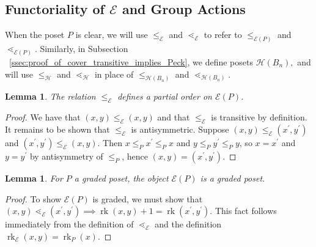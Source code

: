 \documentclass[10 pt]{amsart}
\theoremstyle{plain}
\newtheorem{lem}[thm]{Lemma}
\theoremstyle{definition}
\theoremstyle{remark}
\numberwithin{equation}{section}
\newcommand\ssec{\subsection}
\newcommand\rk{\operatorname{rk}}
\begin{document}
\ssec{Functoriality of $\mathcal E$ and Group Actions}

When the poset $P$ is clear, we will use $\leq_{\mathcal E}$ and $\lessdot_{\mathcal E}$ to refer to $\leq_{\mathcal E(P)}$ and $\lessdot_{\mathcal E(P)}$. Similarly, in Subsection ~\ref{ssec:proof_of_cover_transitive_implies_Peck}, we define posets $\mathcal H(B_n),$ and will use $\leq_{\mathcal H}$ and $\lessdot_{\mathcal H}$ in place of $\leq_{\mathcal H(B_n)}$ and $\lessdot_{\mathcal H(B_n)}$.

\begin{lem}\label{lem:f_partial_order}
The relation $\le_{\mathcal E}$ defines a partial order on $\mathcal E(P)$.
\end{lem}

\begin{proof}
We have that $(x, y)\le_{\mathcal E} (x, y)$ and that $\le_{\mathcal E}$ is transitive by definition.  It remains to be shown that $\le_{\mathcal E}$ is antisymmetric.  Suppose $(x, y)\le_{\mathcal E} (x^\prime, y^\prime)$ and $(x^\prime, y^\prime)\le_{\mathcal E} (x, y)$.  Then $x\le_P x^\prime \le_P x$ and $y\le_P y^\prime \le_P y$, so $x = x^\prime$ and $y=y^\prime$ by antisymmetry of $\le_P$, hence $(x, y) = (x^\prime, y^\prime)$.
\end{proof}

\begin{lem}\label{lem:FP_graded_poset}
For $P$ a graded poset, the object $\mathcal E(P)$ is a graded poset.
\end{lem}

\begin{proof}
To show $\mathcal E(P)$ is graded, we must show that $(x, y) \lessdot_{\mathcal E} (x^\prime, y^\prime) \implies \rk(x, y)+1 = \rk(x^\prime , y^\prime)$.  This fact follows immediately from the definition of $\lessdot_{\mathcal E}$ and the definition $\rk_{\mathcal E}(x, y) = \rk_P(x)$.
\end{proof}

\end{document}

